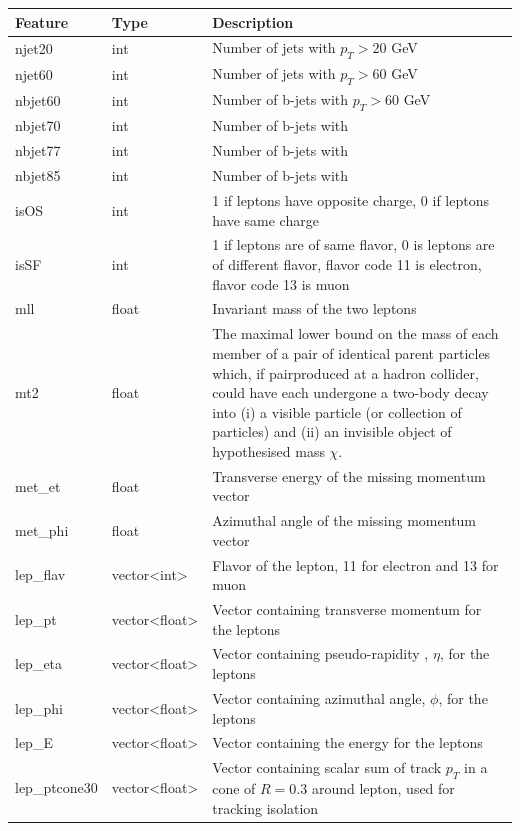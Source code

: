 \documentclass[ reprint, amsmath,amssymb, aps, nofootinbib]{revtex4-2}
\begin{document}
\begin{table}[H]
\begin{center}
\begin{tabular}{|C{4.5cm}|C{4.5cm}|L{9.5cm}|}
    Feature & Type & Description \\ \hline
    njet20 & int & Number of jets with $p_T > 20$ GeV\\ \hline
    njet60 & int & Number of jets with $p_T > 60$ GeV  \\ \hline
    nbjet60 & int & Number of b-jets with $p_T > 60$ GeV  \\ \hline
    nbjet70 & int & Number of b-jets with   \\ \hline
    nbjet77 & int & Number of b-jets with   \\ \hline
    nbjet85 & int & Number of b-jets with   \\ \hline
    isOS  & int & 1 if leptons have opposite charge, 0 if leptons have same charge \\ \hline
    isSF & int & 1 if leptons are of same flavor, 0 is leptons are of different flavor, flavor code 11 is electron, flavor code 13 is muon \\ \hline
    mll & float & Invariant mass of the two leptons \\ \hline
    mt2 & float & The maximal lower bound on the mass of each member of a
    pair of identical parent particles which, if pairproduced at a hadron collider, could have each
    undergone a two-body decay into (i) a visible
    particle (or collection of particles) and (ii) an
    invisible object of hypothesised mass $\chi$\cite{Lester_2011}.\\ \hline
    met\_et & float & Transverse energy of the missing momentum vector \\ \hline
    met\_phi & float & Azimuthal angle of the missing momentum vector\\ \hline
    lep\_flav & vector<int> & Flavor of the lepton, 11 for electron and 13 for muon \\ \hline
    lep\_pt & vector<float> & Vector containing transverse momentum for the leptons \\ \hline
    lep\_eta & vector<float> & Vector containing pseudo-rapidity , $\eta$, for the leptons \\ \hline
    lep\_phi & vector<float> & Vector containing azimuthal angle, $\phi$, for the leptons \\ \hline
    lep\_E & vector<float> & Vector containing the energy for the leptons \\ \hline
    lep\_ptcone30 & vector<float>  & Vector containing scalar sum of track $p_T$ in a cone of $R=0.3$ around lepton, used for tracking isolation \\ \hline

\end{tabular}
\end{center}
\end{table}
\end{document}
